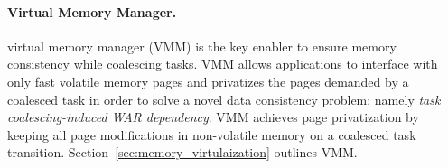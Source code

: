 \paragraph{Virtual Memory Manager.}
\sys virtual memory manager (VMM) is the key enabler to ensure memory consistency while coalescing tasks. VMM allows applications to interface with only fast volatile memory pages and privatizes the pages demanded by a coalesced task in order to solve a novel data consistency problem; namely \emph{task coalescing-induced WAR dependency}. VMM achieves page privatization by keeping all page modifications in non-volatile memory on a coalesced task transition. Section~\ref{sec:memory_virtulaization} outlines VMM.
